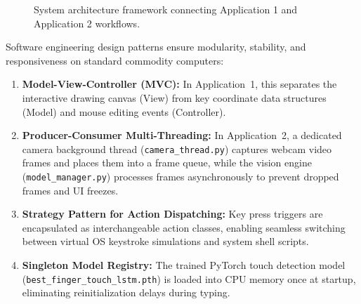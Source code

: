 \begin{figure}[htbp]
{%
}
\caption{System architecture framework connecting Application 1 and Application 2 workflows.}
\label{fig:system_architecture_framework}
\end{figure}

Software engineering design patterns ensure modularity, stability, and responsiveness on standard commodity computers:
\begin{enumerate}
    \item \textbf{Model-View-Controller (MVC):} In Application~1, this separates the interactive drawing canvas (View) from key coordinate data structures (Model) and mouse editing events (Controller).
    \item \textbf{Producer-Consumer Multi-Threading:} In Application~2, a dedicated camera background thread (\texttt{camera\_thread.py}) captures webcam video frames and places them into a frame queue, while the vision engine (\texttt{model\_manager.py}) processes frames asynchronously to prevent dropped frames and UI freezes.
    \item \textbf{Strategy Pattern for Action Dispatching:} Key press triggers are encapsulated as interchangeable action classes, enabling seamless switching between virtual OS keystroke simulations and system shell scripts.
    \item \textbf{Singleton Model Registry:} The trained PyTorch touch detection model (\texttt{best\_finger\_touch\_lstm.pth}) is loaded into CPU memory once at startup, eliminating reinitialization delays during typing.
\end{enumerate}

